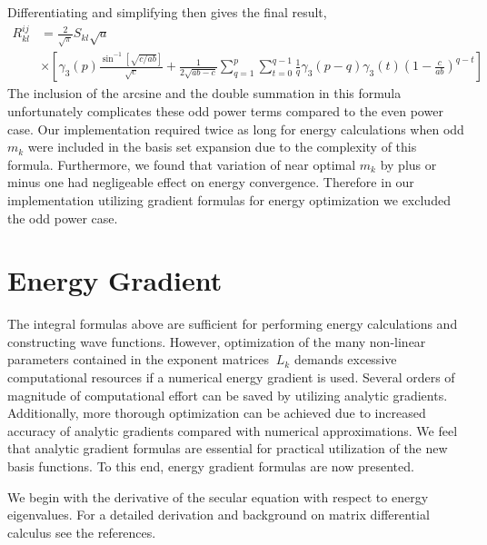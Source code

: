 \documentclass[12pt]{article}
\begin{document}
Differentiating and simplifying then gives the final result,
\begin{align}
R_{kl}^{ij}  & =\frac{2}{\sqrt{\pi}}S_{kl}\sqrt{a}\nonumber\\
& \times\left[  \gamma_{3}\left(  p\right)  \frac{\sin^{-1}\left[  \sqrt
{c/ab}\right]  }{\sqrt{c}}+\frac{1}{2\sqrt{ab-c}}\sum_{q=1}^{p}\sum
_{t=0}^{q-1}\frac{1}{q}\gamma_{3}\left(  p-q\right)  \gamma_{3}\left(
t\right)  \left(  1-\frac{c}{ab}\right)  ^{q-t}\right] \label{Rklodd}%
\end{align}
The inclusion of the arcsine and the double summation in this formula
unfortunately complicates these odd power terms compared to the even power
case. Our implementation required twice as long for energy calculations when
odd $m_{k}$ were included in the basis set expansion due to the complexity of
this formula. Furthermore, we found that variation of near optimal $m_{k}$ by
plus or minus one had negligeable effect on energy convergence. Therefore in
our implementation utilizing gradient formulas for energy optimization we
excluded the odd power case.

\section{Energy Gradient}

The integral formulas above are sufficient for performing energy calculations
and constructing wave functions. However, optimization of the many non-linear
parameters contained in the exponent matrices $\ L_{k}$ demands excessive
computational resources if a numerical energy gradient is used. Several orders
of magnitude of computational effort can be saved by utilizing analytic
gradients. Additionally, more thorough optimization can be achieved due to
increased accuracy of analytic gradients compared with numerical
approximations. We feel that analytic gradient formulas are essential for
practical utilization of the new basis functions. To this end, energy gradient
formulas are now presented.

We begin with the derivative of the secular equation with respect to energy
eigenvalues. For a detailed derivation and background on matrix differential
calculus see the references\cite{Kinghorn95a,Kinghorn95b}.
\end{document}
